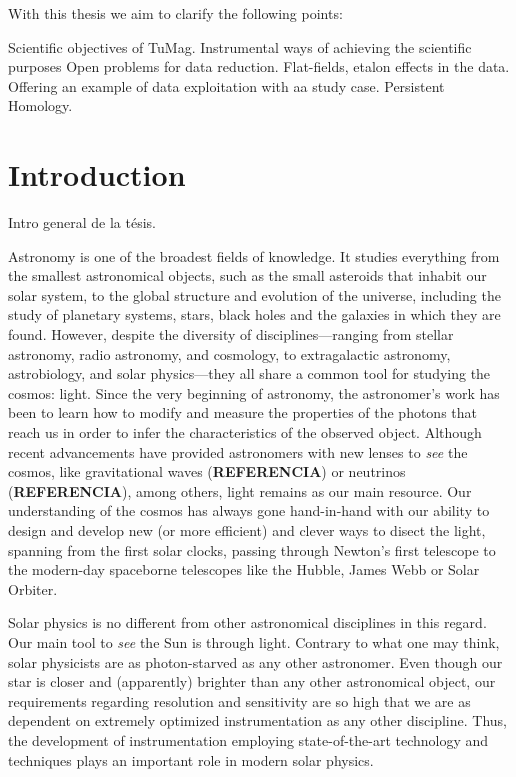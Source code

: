 With this thesis we aim to clarify the following points:

\begin{itemize}
  \Myitem Scientific objectives of TuMag.
  \Myitem Instrumental ways of achieving the scientific purposes
  \Myitem Open problems for data reduction. Flat-fields, etalon effects in the data. 
  \Myitem Offering an example of data exploitation with aa study case. Persistent Homology.
\end{itemize}

\section{Introduction}

Intro general de la tésis. 

Astronomy is one of the broadest fields of knowledge. It studies everything from the smallest astronomical objects, such as the small asteroids that inhabit our solar system, to the global structure and evolution of the universe, including the study of planetary systems, stars, black holes and the galaxies in which they are found. However, despite the diversity of disciplines—ranging from stellar astronomy, radio astronomy, and cosmology, to extragalactic astronomy, astrobiology, and solar physics—they all share a common tool for studying the cosmos: light. Since the very beginning of astronomy, the astronomer's work has been to learn how to modify and measure the properties of the photons that reach us in order to infer the characteristics of the observed object. Although recent advancements have provided astronomers with new lenses to \textit{see} the cosmos, like gravitational waves (\textbf{REFERENCIA}) or neutrinos (\textbf{REFERENCIA}), among others, light remains as our main resource. Our understanding of the cosmos has always gone hand-in-hand with our ability to design and develop new (or more efficient) and clever ways to disect the light, spanning from the first solar clocks, passing through Newton's first telescope to the modern-day spaceborne telescopes like the Hubble, James Webb or Solar Orbiter. 

Solar physics is no different from other astronomical disciplines in this regard. Our main tool to \textit{see} the Sun is through light. Contrary to what one may think, solar physicists are as photon-starved as any other astronomer. Even though our star is closer and (apparently) brighter than any other astronomical object, our requirements regarding resolution and sensitivity are so high that we are as dependent on extremely optimized instrumentation as any other discipline. Thus, the development of instrumentation employing state-of-the-art technology and techniques plays an important role in modern solar physics.


